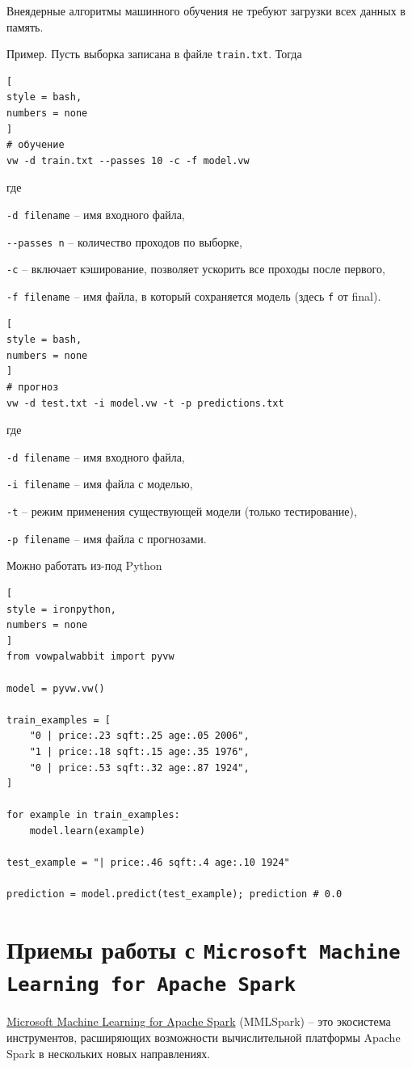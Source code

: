 \documentclass[%
	11pt,
	a4paper,
	utf8,
		]{article}
\begin{document}
Внеядерные алгоритмы машинного обучения не требуют загрузки всех данных в память.

Пример. Пусть выборка записана в файле \texttt{train.txt}. Тогда
\begin{lstlisting}[
style = bash,
numbers = none
]
# обучение
vw -d train.txt --passes 10 -c -f model.vw
\end{lstlisting}
где

\texttt{-d filename} -- имя входного файла,

\verb|--passes n| -- количество проходов по выборке,

\verb|-c| -- включает кэширование, позволяет ускорить все проходы после первого,

\verb|-f filename| -- имя файла, в который сохраняется модель (здесь \texttt{f} от final).

\begin{lstlisting}[
style = bash,
numbers = none
]
# прогноз
vw -d test.txt -i model.vw -t -p predictions.txt
\end{lstlisting}
где

\texttt{-d filename} -- имя входного файла,

\texttt{-i filename} -- имя файла с моделью,

\texttt{-t} -- режим применения существующей модели (только тестирование),

\texttt{-p filename} -- имя файла с прогнозами.

Можно работать из-под Python
\begin{lstlisting}[
style = ironpython,
numbers = none
]
from vowpalwabbit import pyvw

model = pyvw.vw()

train_examples = [
    "0 | price:.23 sqft:.25 age:.05 2006",
    "1 | price:.18 sqft:.15 age:.35 1976",
    "0 | price:.53 sqft:.32 age:.87 1924",
]

for example in train_examples:
    model.learn(example)
    
test_example = "| price:.46 sqft:.4 age:.10 1924"

prediction = model.predict(test_example); prediction # 0.0
\end{lstlisting}


\section{Приемы работы с \texttt{Microsoft Machine Learning for Apache Spark}}

\href{https://github.com/Azure/mmlspark}{Microsoft Machine Learning for Apache Spark} (MMLSpark) -- это экосистема инструментов, расширяющих возможности вычислительной платформы Apache Spark в нескольких новых направлениях.
\end{document}
